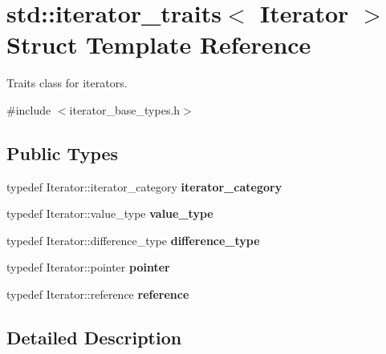 \hypertarget{structstd_1_1iterator__traits}{}\section{std\+:\+:iterator\+\_\+traits$<$ Iterator $>$ Struct Template Reference}
\label{structstd_1_1iterator__traits}


Traits class for iterators.  




{\ttfamily \#include $<$iterator\+\_\+base\+\_\+types.\+h$>$}

\subsection*{Public Types}
\begin{DoxyCompactItemize}
\item 
typedef Iterator\+::iterator\+\_\+category {\bfseries iterator\+\_\+category}\hypertarget{structstd_1_1iterator__traits_ae6fdb4c94c17baf2d1164b76adb497c9}{}\label{structstd_1_1iterator__traits_ae6fdb4c94c17baf2d1164b76adb497c9}

\item 
typedef Iterator\+::value\+\_\+type {\bfseries value\+\_\+type}\hypertarget{structstd_1_1iterator__traits_acc9ca470413e23879e66a5765c20288c}{}\label{structstd_1_1iterator__traits_acc9ca470413e23879e66a5765c20288c}

\item 
typedef Iterator\+::difference\+\_\+type {\bfseries difference\+\_\+type}\hypertarget{structstd_1_1iterator__traits_a8c210d51b17f58c230db057bed816997}{}\label{structstd_1_1iterator__traits_a8c210d51b17f58c230db057bed816997}

\item 
typedef Iterator\+::pointer {\bfseries pointer}\hypertarget{structstd_1_1iterator__traits_a5edcd8db79e85fe113e2abc89040f39d}{}\label{structstd_1_1iterator__traits_a5edcd8db79e85fe113e2abc89040f39d}

\item 
typedef Iterator\+::reference {\bfseries reference}\hypertarget{structstd_1_1iterator__traits_a3561a2aed406bd87bd0329ff44e9f6fb}{}\label{structstd_1_1iterator__traits_a3561a2aed406bd87bd0329ff44e9f6fb}

\end{DoxyCompactItemize}


\subsection{Detailed Description}
